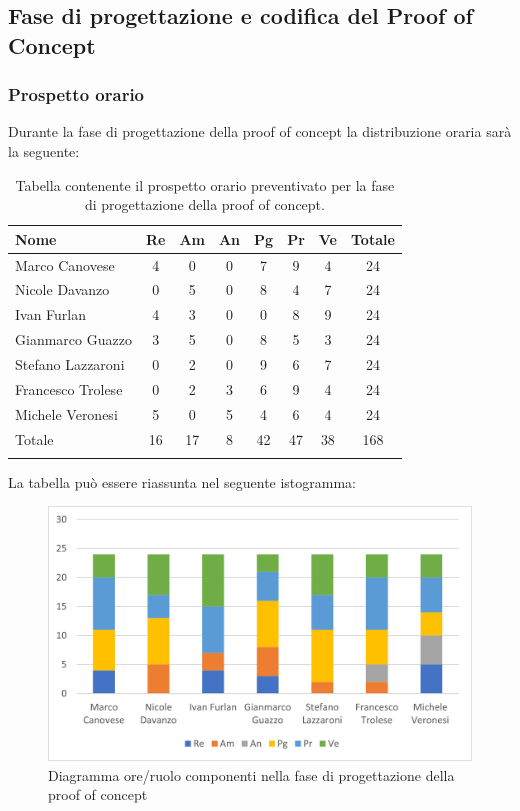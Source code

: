 			\subsection{Fase di progettazione e codifica del Proof of Concept}
            \subsubsection{Prospetto orario}
			Durante la fase di progettazione della proof of concept la distribuzione oraria sarà la seguente:
			
			\begin{longtable}{|l|c|c|c|c|c|c|c|}
				\hline
				\rowcolor{lighter-grayer}
				\textbf{Nome} & \textbf{Re} & \textbf{Am} & \textbf{An} & \textbf{Pg}  & \textbf{Pr}   & \textbf{Ve} & \textbf{Totale} \\
				\hline
				\endfirsthead
				
				\hline
				Marco Canovese & 4& 0 & 0 & 7 & 9 & 4 & 24\\
				\hline
				\hline
				Nicole Davanzo & 0 & 5 & 0 & 8 & 4 & 7 & 24\\
				\hline
				\hline
				Ivan Furlan & 4 & 3 & 0 & 0 & 8 & 9 & 24\\
				\hline
				\hline
				Gianmarco Guazzo & 3 & 5 & 0 & 8 & 5 & 3 & 24\\
				\hline
				\hline
				Stefano Lazzaroni & 0 & 2 & 0 & 9 & 6 & 7 & 24\\
				\hline
				\hline
				Francesco Trolese & 0 & 2 & 3 & 6 & 9 & 4 & 24\\
				\hline
				\hline
				Michele Veronesi & 5 & 0 & 5 & 4 & 6 & 4 & 24\\
				\hline 
				\hline
				Totale & 16 & 17 & 8 & 42 & 47 & 38 & 168\\
				\hline 
				\rowcolor{white}
				\caption{Tabella contenente il prospetto orario preventivato per la fase di progettazione della proof of concept.}
			\end{longtable}

		
			La tabella può essere riassunta nel seguente istogramma:
		
			\begin{figure}[H]
				\centering
				\includegraphics[width=0.8\linewidth]{res/images/preventivo/4-1.png}
				\caption{Diagramma ore/ruolo componenti nella fase di progettazione della proof of concept}
				\label{fig:diagramma suddivisione ruoli fase progettazione della proof of concept}
			\end{figure}
		
